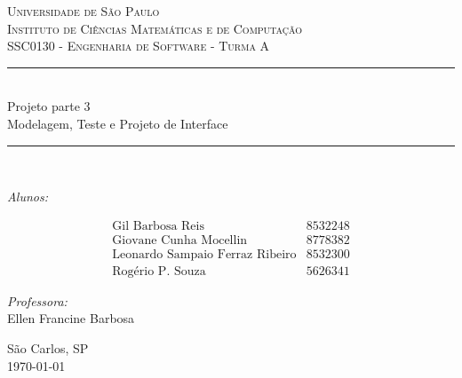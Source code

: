 \documentclass[a4paper,11pt]{article}
\newcommand{\HRule}{\rule{\linewidth}{0.5mm}}
\begin{document}

\begin{center}
    \pagestyle{empty} 
    \textsc{\Large Universidade de São Paulo\\
    Instituto de Ciências Matemáticas e de Computação\\
    SSC0130 - Engenharia de Software - Turma A}\\[5.0cm]

    \HRule \\[0.6cm]
    {\Huge Projeto parte 3\\
    Modelagem, Teste e Projeto de Interface}\\[0.4cm]
    \HRule \\[3.5cm]

    \begin{minipage}{0.45\textwidth}
	    \begin{flushleft} \normalsize
    		\emph{Alunos:}
    		
			\[\begin{array}{lr}
	    		\text{Gil Barbosa Reis} & 8532248 \\
    			\text{Giovane Cunha Mocellin} & 8778382 \\
		    	\text{Leonardo Sampaio Ferraz Ribeiro} & 8532300 \\
				\text{Rogério P. Souza} & 5626341
    		\end{array}\]
    	\end{flushleft}
    \end{minipage}
    \begin{minipage}{0.45\textwidth}
	    \begin{flushright} \normalsize
    		\emph{Professora:} \\
    		Ellen Francine Barbosa
	    \end{flushright}
    \end{minipage}

    \vspace{3.0cm}


    \vfill
    {\Large São Carlos, SP \\ \today}
    \thispagestyle{empty} 
    \newpage
\end{center}

\pagestyle{plain}
\setcounter{page}{1}
\newpage
\end{document}
